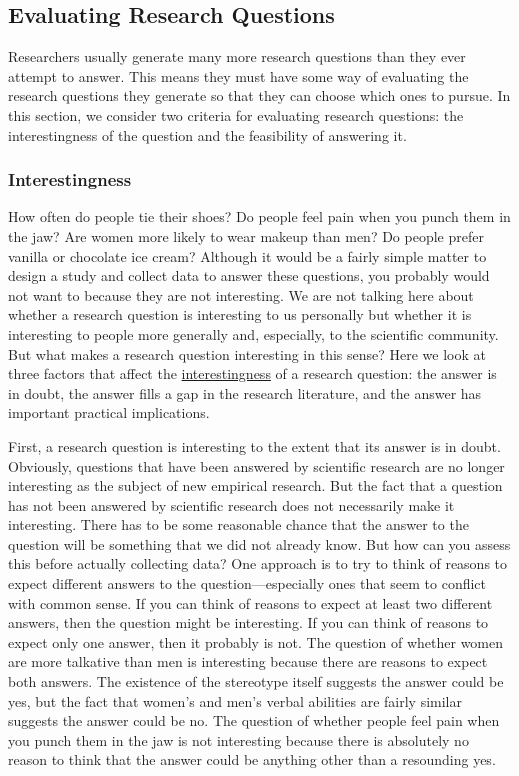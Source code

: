 \documentclass[
]{krantz}
\begin{document}
\subsection*{Evaluating Research Questions}\label{evaluating-research-questions}


Researchers usually generate many more research questions than they ever attempt to answer. This means they must have some way of evaluating the research questions they generate so that they can choose which ones to pursue. In this section, we consider two criteria for evaluating research questions: the interestingness of the question and the feasibility of answering it.

\subsubsection*{Interestingness}\label{interestingness}


How often do people tie their shoes? Do people feel pain when you punch them in the jaw? Are women more likely to wear makeup than men? Do people prefer vanilla or chocolate ice cream? Although it would be a fairly simple matter to design a study and collect data to answer these questions, you probably would not want to because they are not interesting. We are not talking here about whether a research question is interesting to us personally but whether it is interesting to people more generally and, especially, to the scientific community. But what makes a research question interesting in this sense? Here we look at three factors that affect the \hyperref[interestingness]{interestingness} of a research question: the answer is in doubt, the answer fills a gap in the research literature, and the answer has important practical implications.

First, a research question is interesting to the extent that its answer is in doubt. Obviously, questions that have been answered by scientific research are no longer interesting as the subject of new empirical research. But the fact that a question has not been answered by scientific research does not necessarily make it interesting. There has to be some reasonable chance that the answer to the question will be something that we did not already know. But how can you assess this before actually collecting data? One approach is to try to think of reasons to expect different answers to the question---especially ones that seem to conflict with common sense. If you can think of reasons to expect at least two different answers, then the question might be interesting. If you can think of reasons to expect only one answer, then it probably is not. The question of whether women are more talkative than men is interesting because there are reasons to expect both answers. The existence of the stereotype itself suggests the answer could be yes, but the fact that women's and men's verbal abilities are fairly similar suggests the answer could be no. The question of whether people feel pain when you punch them in the jaw is not interesting because there is absolutely no reason to think that the answer could be anything other than a resounding yes.
\end{document}
